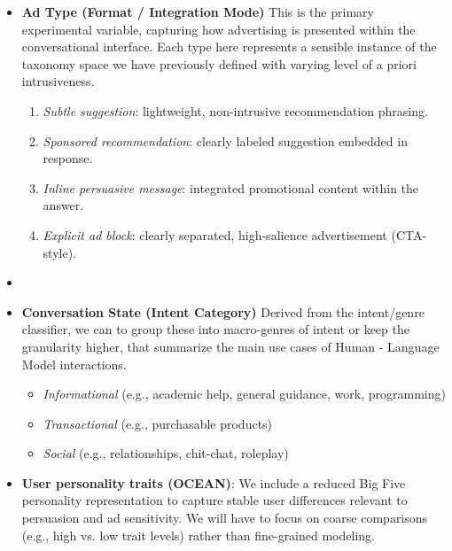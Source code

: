 \documentclass{article}
\begin{document}
\begin{itemize}

    \item \textbf{Ad Type (Format / Integration Mode)}  
    This is the primary experimental variable, capturing how advertising is presented within the conversational interface. Each type here represents a sensible instance of the taxonomy space we have previously defined with varying level of a priori intrusiveness.
    
    \begin{enumerate}
        \item \textit{Subtle suggestion}: lightweight, non-intrusive recommendation phrasing.
        \item \textit{Sponsored recommendation}: clearly labeled suggestion embedded in response.
        \item \textit{Inline persuasive message}: integrated promotional content within the answer.
        \item \textit{Explicit ad block}: clearly separated, high-salience advertisement (CTA-style).
    \end{enumerate}

    \item 

    \item \textbf{Conversation State (Intent Category)}  
    Derived from the intent/genre classifier, we can to group these into macro-genres of intent or keep the granularity higher, that summarize the main use cases of Human - Language Model interactions.
    \begin{itemize}
        \item \textit{Informational} (e.g., academic help, general guidance, work, programming)
        \item \textit{Transactional} (e.g., purchasable products)
        \item \textit{Social} (e.g., relationships, chit-chat, roleplay)
    \end{itemize}

    \item \textbf{User personality traits (OCEAN)}:     We include a reduced Big Five personality representation to capture stable user differences relevant to persuasion and ad sensitivity. We will have to focus on coarse comparisons (e.g., high vs. low trait levels) rather than fine-grained modeling.


    
\end{itemize}
\end{document}

